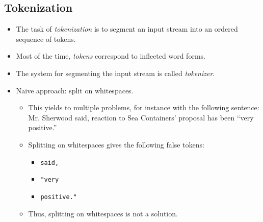         \subsection{Tokenization} %
            \begin{itemize}
            	\item The task of \textit{tokenization} is to segment an input stream into an ordered sequence of tokens.
            	\item Most of the time, \textit{tokens} correspond to inflected word forms.
            	\item The system for segmenting the input stream is called \textit{tokenizer}.
            	\item Naive approach: split on whitespaces.
            		\begin{itemize}
            			\item This yields to multiple problems, for instance with the following sentence: \\ Mr. Sherwood said, reaction to Sea Containers' proposal has been \enquote{very positive.}
            			\item Splitting on whitespaces gives the following false tokens:
            				\begin{itemize}
            					\item \verb$said,$
            					\item \verb$"very$
            					\item \verb$positive."$
            				\end{itemize}
            			\item Thus, splitting on whitespaces is not a solution.
            		\end{itemize}
            \end{itemize}

